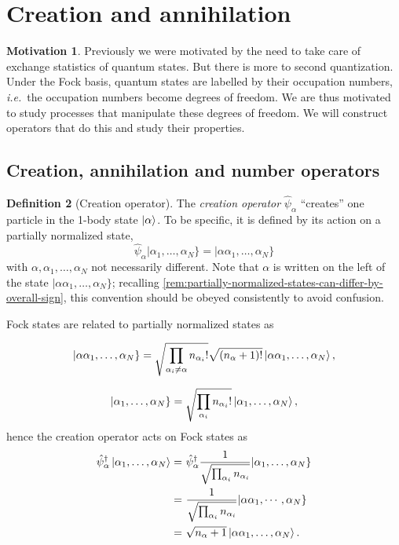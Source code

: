 \documentclass{article}
\theoremstyle{definition}
\newtheorem{mot}{Motivation}[section]
\newtheorem{dfn}[mot]{Definition}
\numberwithin{equation}{section}
\begin{document}
\section{Creation and annihilation}

\begin{mot}
    Previously we were motivated 
    by the need to take care of 
    exchange statistics of quantum states. 
    But there is more to second quantization. 
    Under the Fock basis, 
    quantum states are labelled by 
    their occupation numbers, \textit{i.e.}~the 
    occupation numbers become 
    degrees of freedom. 
    We are thus motivated to 
    study processes that manipulate 
    these degrees of freedom. 
    We will construct operators that 
    do this and study their properties.
\end{mot}

\subsection{Creation, annihilation and number operators}

\begin{dfn}[Creation operator]
    The \emph{creation operator} 
    $\hat{\psi}_{\alpha}$ 
    ``creates'' one particle 
    in the 1-body state $\ket{\alpha}$. 
    To be specific, 
    it is defined 
    by its action on a partially normalized state, 
    \begin{equation}
        \hat{\psi}_{\alpha}
        |\alpha_1, \ldots ,\alpha_{N}\}
        =
        |\alpha \alpha_{1}, \ldots ,\alpha_{N}\}
    \end{equation}
    with 
    $\alpha, \alpha_1, \ldots ,\alpha_{N}$ 
    not necessarily different. 
    Note that $\alpha$ is written 
    on the left of the state 
    $|\alpha\alpha_1, \ldots ,\alpha_{N}\}$; 
    recalling \cref{rem:partially-normalized-states-can-differ-by-overall-sign}, 
    this convention should be obeyed 
    consistently to avoid confusion.
\end{dfn}

Fock states are related to partially normalized states 
as 

\[
    |\alpha \alpha_{1}, \ldots ,\alpha_{N}\}
    =
    \sqrt{
        \prod_{\alpha_{i}\neq \alpha}
        n_{\alpha_{i}}!
    }
    \sqrt{(n_{\alpha}+1)!}
    \ket{\alpha \alpha_1, \ldots ,\alpha_{N}},
\]

\[
    |\alpha_1, \ldots ,\alpha_{N}\}
    =
    \sqrt{
        \prod_{\alpha_{i}}
        n_{\alpha_{i}}!
    }
    \ket{\alpha_1, \ldots ,\alpha_{N}},
\]
hence the creation operator 
acts on Fock states as 
\begin{align*}
    \hat{\psi}^{\dagger}_{\alpha}
    \ket{\alpha_1, \ldots ,\alpha_{N}}
    =&\ 
    \hat{\psi}^{\dagger}_{\alpha}
    \frac{1}{\sqrt{
        \prod_{\alpha_{i}}
        n_{\alpha_{i}}
    }}
    |\alpha_1, \ldots ,\alpha_{N}\} \\
    =&\ 
    \frac{1}{\sqrt{
        \prod_{\alpha_i}
        n_{\alpha_i}
    }}
    |\alpha \alpha_{1},\cdots, \alpha_{N}\} \\
    =&\ 
    \sqrt{n_{\alpha}+1}
    \ket{\alpha \alpha_{1}, \ldots ,\alpha_{N}}.
\end{align*}
\end{document}
